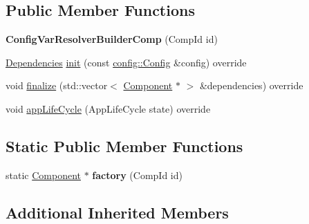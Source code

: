 \subsection*{Public Member Functions}
\begin{DoxyCompactItemize}
\item 
\hypertarget{classtheoria_1_1core_1_1ConfigVarResolverBuilderComp_a14b04299b6eec3576e515ee204004df6}{{\bfseries Config\+Var\+Resolver\+Builder\+Comp} (Comp\+Id id)}\label{classtheoria_1_1core_1_1ConfigVarResolverBuilderComp_a14b04299b6eec3576e515ee204004df6}

\item 
\hyperlink{classtheoria_1_1core_1_1Dependencies}{Dependencies} \hyperlink{classtheoria_1_1core_1_1ConfigVarResolverBuilderComp_a6730be89ad6997911dcae55b42c64395}{init} (const \hyperlink{classtheoria_1_1config_1_1Config}{config\+::\+Config} \&config) override
\item 
void \hyperlink{classtheoria_1_1core_1_1ConfigVarResolverBuilderComp_a9e955a2df7e7944f74e368d35107a467}{finalize} (std\+::vector$<$ \hyperlink{classtheoria_1_1core_1_1Component}{Component} $\ast$ $>$ \&dependencies) override
\item 
void \hyperlink{classtheoria_1_1core_1_1ConfigVarResolverBuilderComp_a3f73bc54ca3d29097525578a218cb72f}{app\+Life\+Cycle} (App\+Life\+Cycle state) override
\end{DoxyCompactItemize}
\subsection*{Static Public Member Functions}
\begin{DoxyCompactItemize}
\item 
\hypertarget{classtheoria_1_1core_1_1ConfigVarResolverBuilderComp_a0455ab86fe03c2aaefe5ba57a4a314d1}{static \hyperlink{classtheoria_1_1core_1_1Component}{Component} $\ast$ {\bfseries factory} (Comp\+Id id)}\label{classtheoria_1_1core_1_1ConfigVarResolverBuilderComp_a0455ab86fe03c2aaefe5ba57a4a314d1}

\end{DoxyCompactItemize}
\subsection*{Additional Inherited Members}


